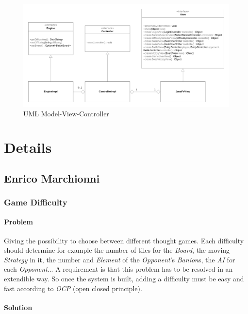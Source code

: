 \documentclass[12pt, a4paper]{report}
\begin{document}
    \begin{figure}[ht]
    \centering{}
    \includegraphics[width=12cm]{mvc}
    \caption{UML Model-View-Controller}
    \end{figure}

\section{Details}

    \subsection*{Enrico Marchionni}

        \subsubsection{Game Difficulty}

            \paragraph{Problem}
            
            Giving the possibility to choose between different thought games.
            Each difficulty should determine for example the number of tiles for the \emph{Board}, the moving \emph{Strategy} in it,
            the number and \emph{Element} of the \emph{Opponent}'s \emph{Banion}s, the \emph{AI} for each \emph{Opponent}...
            A requirement is that this problem has to be resolved in an extendible way.
            So once the system is built, adding a difficulty must be easy and fast according to \emph{OCP} (open closed principle).

            \paragraph{Solution}
\end{document}
